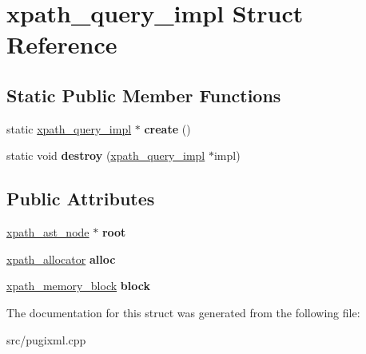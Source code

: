 \hypertarget{structxpath__query__impl}{}\section{xpath\+\_\+query\+\_\+impl Struct Reference}
\label{structxpath__query__impl}
\subsection*{Static Public Member Functions}
\begin{DoxyCompactItemize}
\item 
\mbox{\label{structxpath__query__impl_afcf45bb9a20a4117b1e963d83277aa7f}} 
static \hyperlink{structxpath__query__impl}{xpath\+\_\+query\+\_\+impl} $\ast$ {\bfseries create} ()
\item 
\mbox{\label{structxpath__query__impl_a7233d3b89ed2f20f76b85de918e963fa}} 
static void {\bfseries destroy} (\hyperlink{structxpath__query__impl}{xpath\+\_\+query\+\_\+impl} $\ast$impl)
\end{DoxyCompactItemize}
\subsection*{Public Attributes}
\begin{DoxyCompactItemize}
\item 
\mbox{\label{structxpath__query__impl_ad25499e0c8391005e3a1a60633d631fe}} 
\hyperlink{classxpath__ast__node}{xpath\+\_\+ast\+\_\+node} $\ast$ {\bfseries root}
\item 
\mbox{\label{structxpath__query__impl_ae568b8642d48e729f2ccc2a50467c847}} 
\hyperlink{classxpath__allocator}{xpath\+\_\+allocator} {\bfseries alloc}
\item 
\mbox{\label{structxpath__query__impl_a3a8af3ceed6a504567656ec6d1b62641}} 
\hyperlink{structxpath__memory__block}{xpath\+\_\+memory\+\_\+block} {\bfseries block}
\end{DoxyCompactItemize}


The documentation for this struct was generated from the following file\+:\begin{DoxyCompactItemize}
\item 
src/pugixml.\+cpp\end{DoxyCompactItemize}
